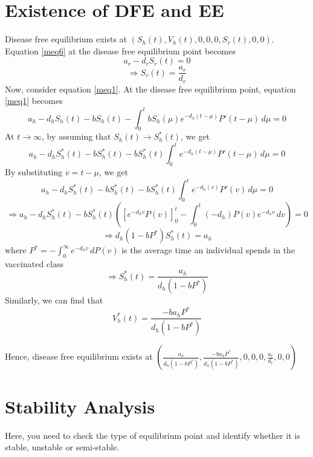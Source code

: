 \section{Existence of DFE and EE}
Disease free equilibrium exists at $(S_{h}(t), V_{h}(t), 0, 0, 0, S_{r}(t), 0, 0)$. Equation \ref{meq6} at the disease free equilibrium point becomes
\[a_{r}-d_{r}S_{r}(t) = 0\]
\[\Rightarrow S_{r}(t) = \frac{a_{r}}{d_{r}}\]
Now, consider equation \ref{meq1}. At the disease free equilibrium point, equation \ref{meq1} becomes
\[a_{h}-d_{h}S_{h}(t)-bS_{h}(t)-\int_{0}^{t} bS_{h}(\mu)e^{-d_{h}(t-\mu)}P'(t-\mu) \,d\mu = 0\]
At $t \rightarrow \infty$, by assuming that $S_{h}(t) \rightarrow S^{*}_{h}(t)$, we get
\[a_{h}-d_{h}S^{*}_{h}(t)-bS^{*}_{h}(t)-bS^{*}_{h}(t)\int_{0}^{t}e^{-d_{h}(t-\mu)}P'(t-\mu) \,d\mu = 0\]
By substituting $v = t-\mu$, we get
\[a_{h}-d_{h}S^{*}_{h}(t)-bS^{*}_{h}(t)-bS^{*}_{h}(t)\int_{0}^{t}e^{-d_{h}(v)}P'(v) \,d\mu = 0\]
\[\Rightarrow a_{h}-d_{h}S^{*}_{h}(t)-bS^{*}_{h}(t)\left(\left[e^{-d_{h}v}P(v)\right]^{t}_{0}-\int_{0}^{t}(-d_{h})P(v)e^{-d_{h}v} \,dv\right) = 0\]
\[\Rightarrow d_{h}(1-bP^{*})S^{*}_{h}(t) = a_{h}\]
where $P^{*} = -\int_{0}^{\infty}e^{-d_{h}v} \,dP(v) $ is the average time an individual spends in the vaccinated class
\[\Rightarrow S^{*}_{h}(t) = \frac{a_{h}}{d_{h}(1-bP^{*})}\]
Similarly, we can find that
\[V^{*}_{h}(t) = \frac{-ba_{h}P^{*}}{d_{h}(1-bP^{*})}\]

Hence, disease free equilibrium exists at $\left(\frac{a_{h}}{d_{h}(1-bP^{*})},\frac{-ba_{h}P^{*}}{d_{h}(1-bP^{*})},0,0,0,\frac{a_{r}}{d_{r}},0,0\right)$

\section{Stability Analysis}
Here, you need to check the type of equilibrium point and identify whether it is stable, unstable or semi-stable.